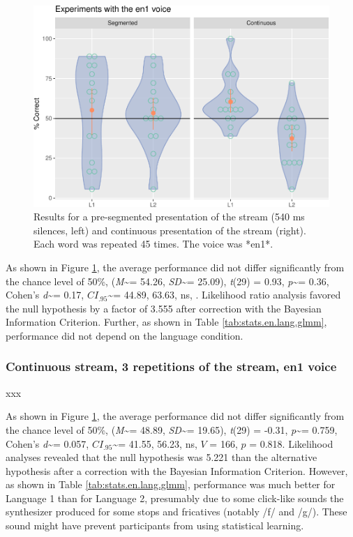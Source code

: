 \documentclass[
]{article}
\newcommand{\T}{{\em t\/}}
\newcommand{\p}{{\em p\/}}
\newcommand{\M}{{\em M\/}}
\newcommand{\SD}{{\em SD\/}}
\newcommand{\D}{Cohen's {\em d\/}}
\newcommand{\CI}{$CI_{.95}$}
\begin{document}
\begin{figure}

{\centering \includegraphics[width=0.8\linewidth]{segmentation_recall_combined_for_revision4_files/figure-latex/stats-london-stats.3x.en.segm-cont.plot-1} 

}

\caption{Results for a pre-segmented presentation of the stream (540 ms silences, left) and continuous presentation of the stream (right). Each word was repeated 45 times. The voice was *en1*.}\label{fig:stats-london-stats.3x.en.segm-cont.plot}
\end{figure}

As shown in Figure \ref{fig:stats-london-stats.3x.en.segm-cont.plot},
the average performance did not differ significantly from the chance
level of 50\%, (\M\textasciitilde= 54.26, \SD\textasciitilde= 25.09),
\T(29) = 0.93, \p\textasciitilde= 0.36, \D\textasciitilde= 0.17,
\CI\textasciitilde= 44.89, 63.63, ns, . Likelihood ratio analysis
favored the null hypothesis by a factor of 3.555 after correction with
the Bayesian Information Criterion. Further, as shown in Table
\ref{tab:stats.en.lang.glmm}, performance did not depend on the language
condition.

\subsubsection{Continuous stream, 3 repetitions of the stream, en1
voice}\label{continuous-stream-3-repetitions-of-the-stream-en1-voice}

xxx

As shown in Figure \ref{fig:stats-london-stats.3x.en.segm-cont.plot},
the average performance did not differ significantly from the chance
level of 50\%, (\M\textasciitilde= 48.89, \SD\textasciitilde= 19.65),
\T(29) = -0.31, \p\textasciitilde= 0.759, \D\textasciitilde= 0.057,
\CI\textasciitilde= 41.55, 56.23, ns, \(V\) = 166, \(p\) = 0.818.
Likelihood analyses revealed that the null hypothesis was 5.221 than the
alternative hypothesis after a correction with the Bayesian Information
Criterion. However, as shown in Table \ref{tab:stats.en.lang.glmm},
performance was much better for Language 1 than for Language 2,
presumably due to some click-like sounds the synthesizer produced for
some stops and fricatives (notably /f/ and /g/). These sound might have
prevent participants from using statistical learning.
\end{document}
